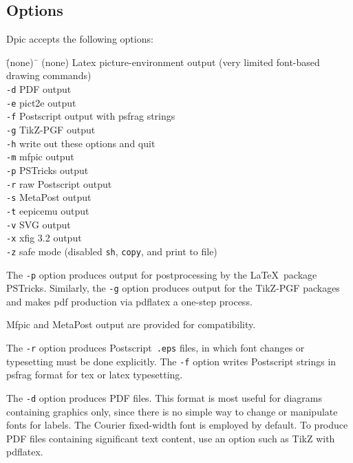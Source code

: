 \documentclass[11pt]{article}
\newcommand{\bq}{}
\newcommand{\Dpic}{{\bq Dpic}\xspace}
\newcommand{\PSTricks}{{\bq PSTricks}\xspace}
\newcommand{\MetaPost}{{\bq MetaPost}\xspace}
\newcommand{\Postscript}{{\bq Postscript}\xspace}
\begin{document}
\subsection{Options}
\Dpic accepts the following options:
\begin{tabbing}
\quad\=\hbox{(none)\ }\= \kill
\> (none) \> Latex picture-environment output (very limited font-based
 drawing commands)\\
\> {\tt -d} \> PDF output \\
\> {\tt -e} \> pict2e output \\
\> {\tt -f} \> Postscript output with psfrag strings \\
\> {\tt -g} \> TikZ-PGF output \\
\> {\tt -h} \> write out these options and quit \\
\> {\tt -m} \> mfpic output \\
\> {\tt -p} \> PSTricks output \\
\> {\tt -r} \> raw Postscript output \\
\> {\tt -s} \> MetaPost output \\
\> {\tt -t} \> eepicemu output \\
\> {\tt -v} \> SVG output \\
\> {\tt -x} \> xfig 3.2 output \\
\> {\tt -z} \> safe mode (disabled {\tt sh}, {\tt copy}, and print to file)
\end{tabbing}

The {\tt -p} option produces output for postprocessing by the
\LaTeX\ package \PSTricks.
Similarly, the {\tt -g} option produces output
for the TikZ-PGF packages and makes pdf production
via pdflatex a one-step process.

Mfpic and \MetaPost output are provided for
compatibility.

The {\tt -r} option produces \Postscript\ {\tt .eps}
files, in which font changes or typesetting must be done explicitly.
The {\tt -f} option writes \Postscript strings in psfrag
format for tex or latex typesetting.

The {\tt -d} option produces PDF files.
This format is most useful for diagrams containing graphics only, since
there is no simple way to change or manipulate fonts for labels.
The Courier fixed-width font is employed by default.
To produce PDF files containing significant text content,
use an option such as TikZ with pdflatex.
\end{document}
